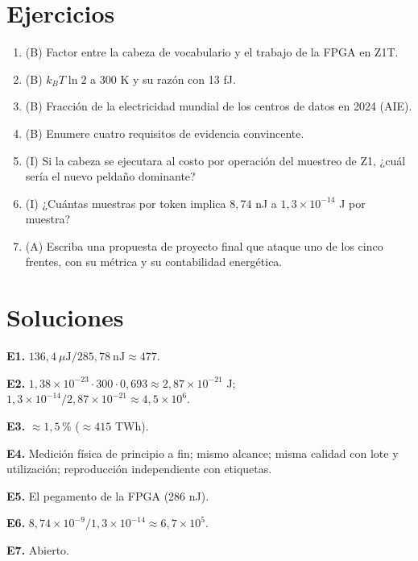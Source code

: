 \documentclass[11pt,a4paper]{article}
\begin{document}
\section{Ejercicios}
\begin{enumerate}[label=\textbf{E\arabic*.}]
\item (B) Factor entre la cabeza de vocabulario y el trabajo de la FPGA en Z1T.
\item (B) $k_BT\ln2$ a 300 K y su razón con 13 fJ.
\item (B) Fracción de la electricidad mundial de los centros de datos en 2024 (AIE).
\item (B) Enumere cuatro requisitos de evidencia convincente.
\item (I) Si la cabeza se ejecutara al costo por operación del muestreo de Z1, ¿cuál sería el nuevo peldaño dominante?
\item (I) ¿Cuántas muestras por token implica $8{,}74$ nJ a $1{,}3\times10^{-14}$ J por muestra?
\item (A) Escriba una propuesta de proyecto final que ataque uno de los cinco frentes, con su métrica y su contabilidad energética.
\end{enumerate}
\section{Soluciones}
\begin{solucion}
\textbf{E1.} $136{,}4\ \mu\text{J}/285{,}78\ \text{nJ}\approx477$.

\textbf{E2.} $1{,}38\times10^{-23}\cdot300\cdot0{,}693\approx2{,}87\times10^{-21}$ J; $1{,}3\times10^{-14}/2{,}87\times10^{-21}\approx4{,}5\times10^6$.

\textbf{E3.} $\approx1{,}5\,\%$ ($\approx415$ TWh).

\textbf{E4.} Medición física de principio a fin; mismo alcance; misma calidad con lote y utilización; reproducción independiente con etiquetas.

\textbf{E5.} El pegamento de la FPGA (286 nJ).

\textbf{E6.} $8{,}74\times10^{-9}/1{,}3\times10^{-14}\approx6{,}7\times10^5$.

\textbf{E7.} Abierto.
\end{solucion}
\end{document}
